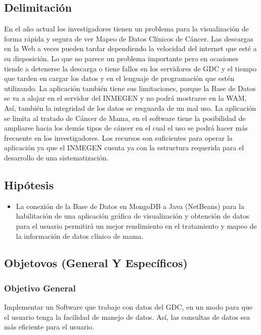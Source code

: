 \documentclass[10pt,a4paper]{article}
\begin{document}
\subsection{Delimitación}
En el a\~no actual los investigadores tienen un problema para la visualizaci\'on de forma r\'apida y segura de ver Mapeo de Datos Cl\'inicos de C\'ancer. Las descargas en la Web a veces pueden tardar dependiendo la velocidad del internet que est\'e a su disposici\'on. Lo que no parece un problema importante pero en ocasiones tiende a detenerse la descarga o tiene fallos en los servidores de GDC y el tiempo que tarden en cargar los datos y en el lenguaje de programaci\'on que est\'en utilizando. La aplicaci\'on tambi\'en tiene sus limitaciones, porque la Base de Datos se va a alojar en el servidor del INMEGEN y no podr\'a mostrarse en la WAM, As\'i, tambi\'en la integridad de los datos se resguarda de un mal uso.
La aplicaci\'on se limita al tratado de C\'ancer de Mama, en el software tiene la posibilidad de ampliarse hacia los dem\'as tipos de c\'ancer en el cual el uso se podr\'a hacer m\'as frecuente en los investigadores.
Los recursos son suficientes para operar la aplicaci\'on ya que el INMEGEN cuenta ya con la estructura requerida para el desarrollo de una sistematizaci\'on.

 
\subsection{Hip\'otesis}

\begin{itemize}


\item La conexi\'on de la Base de Datos en MongoDB a Java (NetBeans) para la habilitaci\'on de una aplicaci\'on gr\'afica de visualizaci\'on y obtenci\'on de datos para el usuario permitir\'a un mejor rendimiento en el tratamiento y mapeo de la informaci\'on de datos cl\'inico de mama.

\end{itemize}
 
\subsection{Objetovos (General Y Espec\'ificos)}

\subsubsection{Objetivo General}

Implementar un Software que trabaje con datos del GDC, en un modo para que el usuario tenga la facilidad de manejo de datos. As\'i, las consultas de datos sea m\'as eficiente para el usuario.
\end{document}
